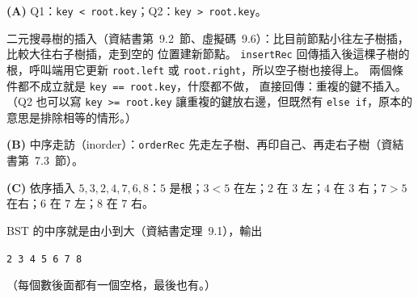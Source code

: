 \begin{pastsoln}
\textbf{(A)} Q1：\texttt{key < root.key}；Q2：\texttt{key > root.key}。

二元搜尋樹的插入（資結書第~9.2~節、虛擬碼~9.6）：比目前節點小往左子樹插，比較大往右子樹插，走到空的
位置建新節點。 \texttt{insertRec} 回傳插入後這棵子樹的根，呼叫端用它更新 \texttt{root.left} 或
\texttt{root.right}，所以空子樹也接得上。 兩個條件都不成立就是 \texttt{key == root.key}，什麼都不做，
直接回傳：重複的鍵不插入。 （Q2 也可以寫 \texttt{key >= root.key} 讓重複的鍵放右邊，但既然有
\texttt{else if}，原本的意思是排除相等的情形。）

\textbf{(B)} 中序走訪（inorder）：\texttt{orderRec} 先走左子樹、再印自己、再走右子樹（資結書第~7.3~節）。

\textbf{(C)} 依序插入 $5, 3, 2, 4, 7, 6, 8$：$5$ 是根；$3 < 5$ 在左；$2$ 在 $3$ 左；$4$ 在 $3$ 右；$7 > 5$
在右；$6$ 在 $7$ 左；$8$ 在 $7$ 右。

\begin{center}
\end{center}

BST 的中序就是由小到大（資結書定理~9.1），輸出
\begin{center}
\texttt{2 3 4 5 6 7 8 }
\end{center}
（每個數後面都有一個空格，最後也有。）
\end{pastsoln}
